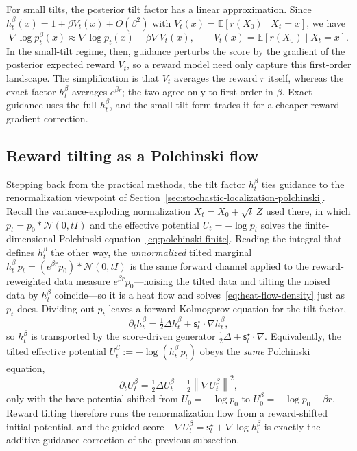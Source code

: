 \documentclass[10pt,a4paper]{amsart}
\numberwithin{equation}{section}
\newcommand{\E}{\mathbb{E}}
\newcommand{\Id}{I}
\newcommand{\norm}[1]{\left\lVert #1 \right\rVert}
\newcommand{\sstar}{\mathsf{s}^{\star}}
\newcommand{\normal}[2]{\mathcal{N}\!\left(#1,#2\right)}
\begin{document}
For small tilts, the posterior tilt factor has a linear approximation.  Since
$h_t^\beta(x)=1+\beta V_t(x)+O(\beta^2)$ with
$V_t(x)=\E[r(X_0)\mid X_t=x]$, we have
\begin{equation}\label{eq:value-guidance}
    \nabla\log p_t^\beta(x)
    \approx
    \nabla\log p_t(x)
    +
    \beta\nabla V_t(x),
    \qquad
    V_t(x)=\E[r(X_0)\mid X_t=x].
\end{equation}
In the small-tilt regime, then, guidance perturbs the score by the gradient of
the posterior expected reward $V_t$, so a reward model need only capture this
first-order landscape.  The simplification is that $V_t$ averages the reward $r$
itself, whereas the exact factor $h_t^\beta$ averages $e^{\beta r}$; the two
agree only to first order in $\beta$.  Exact guidance uses the full $h_t^\beta$,
and the small-tilt form trades it for a cheaper reward-gradient correction.

\subsection{Reward tilting as a Polchinski flow}
\label{subsec:polchinski-tilt}

Stepping back from the practical methods, the tilt factor $h_t^\beta$ ties
guidance to the renormalization viewpoint of
Section~\ref{sec:stochastic-localization-polchinski}.  Recall the
variance-exploding normalization $X_t=X_0+\sqrt t\,Z$ used there, in which
$p_t=p_0*\normal{0}{t\Id}$ and the effective potential $U_t=-\log p_t$ solves the
finite-dimensional Polchinski equation~\eqref{eq:polchinski-finite}.
Reading the integral that defines $h_t^\beta$ the other way, the
\emph{unnormalized} tilted marginal
$h_t^\beta\,p_t=(e^{\beta r}p_0)*\normal{0}{t\Id}$ is the same forward
channel applied to the reward-reweighted data measure $e^{\beta r}p_0$---noising
the tilted data and tilting the noised data by $h_t^\beta$ coincide---so it is a
heat flow and solves~\eqref{eq:heat-flow-density} just as $p_t$ does.  Dividing
out $p_t$ leaves a forward Kolmogorov equation for the tilt factor,
\begin{equation}\label{eq:tilt-pde}
    \partial_t h_t^\beta
    =
    \tfrac12\Delta h_t^\beta
    +
    \sstar_t\cdot\nabla h_t^\beta,
\end{equation}
so $h_t^\beta$ is transported by the score-driven generator
$\tfrac12\Delta+\sstar_t\cdot\nabla$.  Equivalently, the tilted effective
potential $U_t^\beta:=-\log(h_t^\beta\,p_t)$ obeys the \emph{same} Polchinski equation,
\begin{equation}\label{eq:polchinski-tilt}
    \partial_t U_t^\beta
    =
    \tfrac12\Delta U_t^\beta
    -
    \tfrac12\norm{\nabla U_t^\beta}^2,
\end{equation}
only with the bare potential shifted from $U_0=-\log p_0$ to $U_0^{\beta} = -\log p_0-\beta r$.
Reward tilting therefore runs the renormalization flow from a
reward-shifted initial potential, and the guided score
$-\nabla U_t^\beta=\sstar_t+\nabla\log h_t^\beta$ is exactly the additive
guidance correction of the previous subsection.
\end{document}
